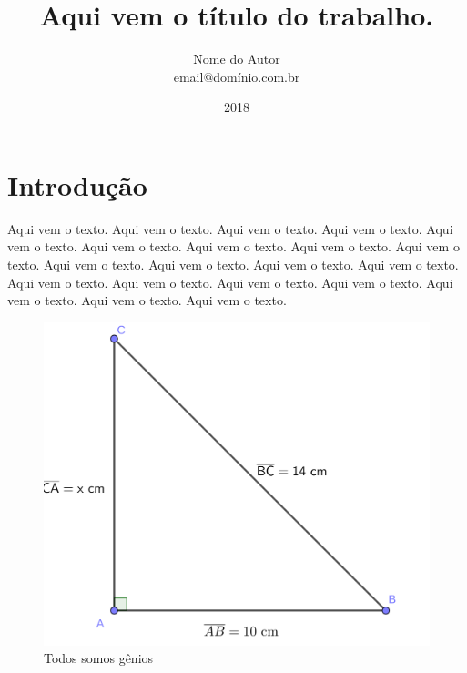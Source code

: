 \documentclass[a4paper, 12pt]{article}
\title{Aqui vem o título do trabalho.}
\author{Nome do Autor \\ email@domínio.com.br}
\date{2018} %
\begin{document}
\maketitle %

\tableofcontents %

\newpage %

\listoffigures %

\newpage

\listoftables %

\newpage


\section{Introdução} %

Aqui vem o texto. Aqui vem o texto. Aqui vem o texto. Aqui vem o texto. 
Aqui vem o texto. Aqui vem o texto. Aqui vem o texto. Aqui vem o texto. 
Aqui vem o texto. Aqui vem o texto. Aqui vem o texto. Aqui vem o texto. 
Aqui vem o texto. Aqui vem o texto. Aqui vem o texto. Aqui vem o texto. 
Aqui vem o texto. Aqui vem o texto. Aqui vem o texto. Aqui vem o texto.  \cite{meuatalho} %

\begin{figure}[htb]
    \centering
    \includegraphics[scale=1]{imagens/exercicio.png}
    \caption{Todos somos gênios}
    \label{figura-genios}
\end{figure}
\end{document}
